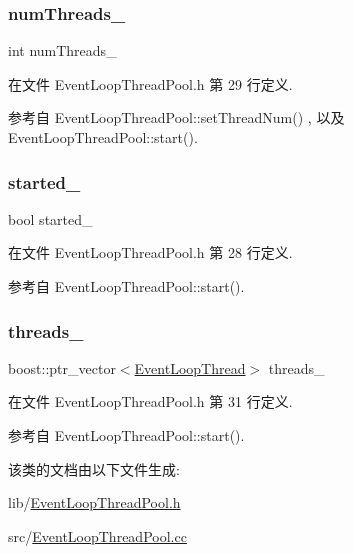 \subsubsection{\texorpdfstring{num\+Threads\+\_\+}{numThreads\_}}
{\footnotesize\ttfamily int num\+Threads\+\_\+\hspace{0.3cm}{\ttfamily [private]}}



在文件 Event\+Loop\+Thread\+Pool.\+h 第 29 行定义.



参考自 Event\+Loop\+Thread\+Pool\+::set\+Thread\+Num() , 以及 Event\+Loop\+Thread\+Pool\+::start().

\mbox{\label{classmuduo_1_1EventLoopThreadPool_a5ad69cfc4163d7797bc0f0d7eadb95a7}} 
\subsubsection{\texorpdfstring{started\+\_\+}{started\_}}
{\footnotesize\ttfamily bool started\+\_\+\hspace{0.3cm}{\ttfamily [private]}}



在文件 Event\+Loop\+Thread\+Pool.\+h 第 28 行定义.



参考自 Event\+Loop\+Thread\+Pool\+::start().

\mbox{\label{classmuduo_1_1EventLoopThreadPool_aa5d7bf46fd47a27bf0fd76b1dfad1fb1}} 
\subsubsection{\texorpdfstring{threads\+\_\+}{threads\_}}
{\footnotesize\ttfamily boost\+::ptr\+\_\+vector$<$\hyperlink{classmuduo_1_1EventLoopThread}{Event\+Loop\+Thread}$>$ threads\+\_\+\hspace{0.3cm}{\ttfamily [private]}}



在文件 Event\+Loop\+Thread\+Pool.\+h 第 31 行定义.



参考自 Event\+Loop\+Thread\+Pool\+::start().



该类的文档由以下文件生成\+:\begin{DoxyCompactItemize}
\item 
lib/\hyperlink{EventLoopThreadPool_8h}{Event\+Loop\+Thread\+Pool.\+h}\item 
src/\hyperlink{EventLoopThreadPool_8cc}{Event\+Loop\+Thread\+Pool.\+cc}\end{DoxyCompactItemize}
